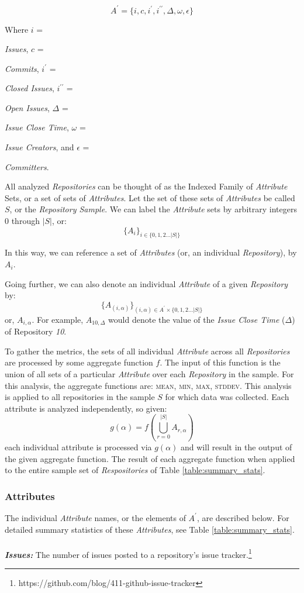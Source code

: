 \documentclass{proc}
\begin{document}
\[A^\prime = \{i, c, i^\prime, i^{\prime\prime}, \Delta, \omega, \epsilon\}\]

Where $i$ = {\textit{Issues}, $c$ = {\textit{Commits}, $i^\prime$ = {\textit{Closed Issues}, $i^{\prime\prime}$ = {\textit{Open Issues}, $\Delta$ = {\textit{Issue Close Time}, $\omega$ = {\textit{Issue Creators}, and $\epsilon$ = {\textit{Committers}.

All analyzed \textit{Repositories} can be thought of as the Indexed Family of \textit{Attribute} Sets, or a set of sets of \textit{Attributes}. Let the set of these sets of \textit{Attributes} be called $S$, or the \textit{Repository Sample}. We can label the \textit{Attribute} sets by arbitrary integers 0 through $|S|$, or:
\[ \{A_i\}_{i \in \{0,1,2 ... |S|\} }\]

In this way, we can reference a set of \textit{Attributes} (or, an individual \textit{Repository}), by $A_i$. 

Going further, we can also denote an individual \textit{Attribute} of a given \textit{Repository} by:
\[ \{A_{(i,\alpha)}\}_{(i,\alpha) \in A^\prime \times \{0,1,2 ... |S|\} } \]
or, $A_{i,\alpha}$. For example, $A_{10,\Delta}$ would denote the value of the \textit{Issue Close Time} ($\Delta$) of Repository \textit{10}.

To gather the metrics, the sets of all individual \textit{Attribute} across all \textit{Repositories} are processed by some aggregate function $f$. The input of this function is the union of all sets of a particular \textit{Attribute} over each \textit{Repository} in the sample. For this analysis, the aggregate functions are: \textsc{mean}, \textsc{min}, \textsc{max}, \textsc{stddev}. This analysis is applied to all repositories in the sample $S$ for which data was collected. Each attribute is analyzed independently, so given:
\[ g(\alpha) =f \left( \bigcup\limits_{r = 0}^{|S|}  A_{r,\alpha} \right) \]
each individual attribute is processed via $g(\alpha)$ and will result in the output of the given aggregate function. The result of each aggregate function when applied to the entire sample set of \textit{Respositories} of Table \ref{table:summary_stats}.

\subsubsection{Attributes}
\label{sec:attributes}
The individual \textit{Attribute} names, or the elements of $A^\prime$, are described below. For detailed summary statistics of these \textit{Attributes}, see Table \ref{table:summary_stats}.\\\\
\noindent \textbf{\textit{Issues:}}
The number of issues posted to a repository's issue tracker.\footnote{https://github.com/blog/411-github-issue-tracker}

}}}}}}}
\end{document}
